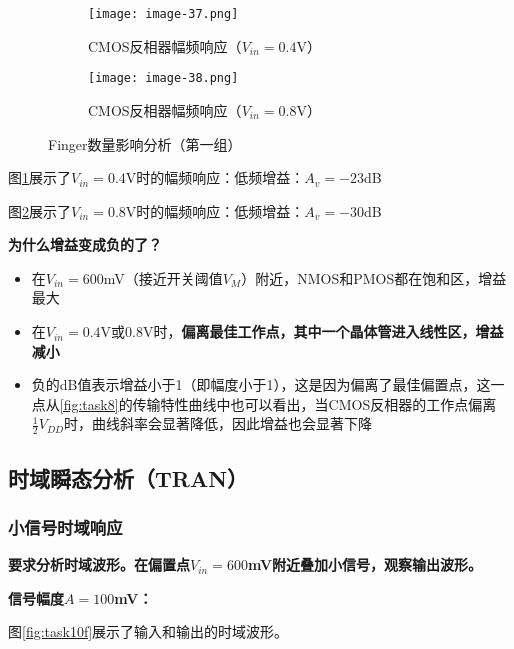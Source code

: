 \documentclass[UTF8,12pt,a4paper]{ctexart}
\begin{document}
\begin{figure}[htbp]
    \centering
    \begin{subfigure}[b]{0.45\textwidth} %
        \centering
        \texttt{[image: image-37.png]} 
        \caption{CMOS反相器幅频响应（$V_{in} = 0.4$V）}
        \label{fig:task10d}
    \end{subfigure}
    \hfill %
    \begin{subfigure}[b]{0.45\textwidth}
        \centering
        \texttt{[image: image-38.png]} 
        \caption{CMOS反相器幅频响应（$V_{in} = 0.8$V）}
        \label{fig:task10e}
    \end{subfigure}
    \label{fig:task10de}
    \caption{Finger数量影响分析（第一组）}
\end{figure}

图\ref{fig:task10d}展示了$V_{in} = 0.4$V时的幅频响应：低频增益：$A_v = -23$dB

图\ref{fig:task10e}展示了$V_{in} = 0.8$V时的幅频响应：低频增益：$A_v = -30$dB

\textbf{为什么增益变成负的了？}

\begin{itemize}
\item 在$V_{in} = 600$mV（接近开关阈值$V_M$）附近，NMOS和PMOS都在饱和区，增益最大
\item 在$V_{in} = 0.4$V或0.8V时，\textbf{偏离最佳工作点，其中一个晶体管进入线性区，增益减小}
\item 负的dB值表示增益小于1（即幅度小于1），这是因为偏离了最佳偏置点，这一点从\ref{fig:task8}的传输特性曲线中也可以看出，当CMOS反相器的工作点偏离$\frac{1}{2}V_{DD}$时，曲线斜率会显著降低，因此增益也会显著下降
\end{itemize}

\subsection{时域瞬态分析（TRAN）}

\subsubsection{小信号时域响应}
\textbf{要求分析时域波形。在偏置点$V_{in} = 600$mV附近叠加小信号，观察输出波形。}

\textbf{信号幅度$A = 100$mV：}

图\ref{fig:task10f}展示了输入和输出的时域波形。
\end{document}
